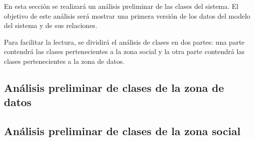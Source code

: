 En esta sección se realizará un análisis preliminar de las clases del sistema.  El objetivo de este análisis será mostrar una primera versión de los datos del modelo del sistema y de sus relaciones.

Para facilitar la lectura, se dividirá el análisis de clases en dos partes: una parte contendrá las clases pertenecientes a la zona social y la otra parte contendrá las clases pertenecientes a la zona de datos.


\subsection{Análisis preliminar de clases de la zona de datos}
\label{clases_preliminares_modelo_datos}


\subsection{Análisis preliminar de clases de la zona social}
\label{clases_preliminares_modelo_debate}
